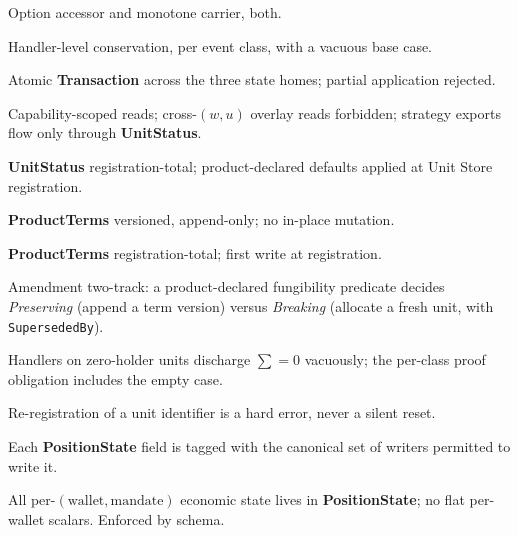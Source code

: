 \begin{description}[style=nextline]
\item[C1] Option accessor and monotone carrier, both.
\item[C2] Handler-level conservation, per event class, with a vacuous base case.
\item[C3] Atomic \textbf{Transaction} across the three state homes; partial application rejected.
\item[C4] Capability-scoped reads; cross-$(w,u)$ overlay reads forbidden; strategy exports flow only through \textbf{UnitStatus}.
\item[C5] \textbf{UnitStatus} registration-total; product-declared defaults applied at Unit Store registration.
\item[C6] \textbf{ProductTerms} versioned, append-only; no in-place mutation.
\item[C7] \textbf{ProductTerms} registration-total; first write at registration.
\item[C8] Amendment two-track: a product-declared fungibility predicate decides \emph{Preserving} (append a term version) versus \emph{Breaking} (allocate a fresh unit, with \texttt{SupersededBy}).
\item[C9] Handlers on zero-holder units discharge $\sum=0$ vacuously; the per-class proof obligation includes the empty case.
\item[C10] Re-registration of a unit identifier is a hard error, never a silent reset.
\item[C11] Each \textbf{PositionState} field is tagged with the canonical set of writers permitted to write it.
\item[C12] All per-$(\text{wallet},\text{mandate})$ economic state lives in \textbf{PositionState}; no flat per-wallet scalars. Enforced by schema.
\end{description}
